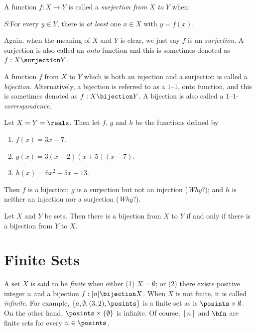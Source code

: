 A function $f:X\rightarrow Y$ is called a \textit{surjection from}
$X$ \textit{to} $Y$ when:

\medskip
\noindent
$S$:\quad For every $y\in Y$, there is \textit{at least} one $x\in X$ with
$y=f(x)$.

\medskip
Again, when the meaning of $X$ and $Y$ is clear, we just say $f$ is an 
\textit{surjection}.  A surjection is also called an \textit{onto} 
function and this is sometimes denoted as\\
$f:X\surjection Y$.

A function $f$ from $X$ to $Y$ which is both an injection and a surjection
is called a \textit{bijection}.  Alternatively, a bijection is referred
to as a $1$--$1$, onto function, and this is sometimes denoted as
$f:X \bijection Y$.  A bijection is also called a 
$1$--$1$-\textit{correspondence}.

\begin{example}
Let $X=Y=\reals$.  Then let $f$, $g$ and $h$ be the
functions defined by

\begin{enumerate}
\item $f(x)=3x-7$.
\item $g(x)=3(x-2)(x+5)(x-7)$.
\item $h(x)=6x^2-5x+13$.
\end{enumerate}
Then $f$ is a bijection; $g$ is a surjection but not an
injection (\textit{Why}?); and $h$ is neither an injection nor a
surjection (\textit{Why}?).
\end{example}

\begin{proposition}
Let $X$ and $Y$ be sets. Then there is a bijection from $X$ to $Y$
if and only if there is a bijection from $Y$ to $X$.
\end{proposition}

\section{Finite Sets}

A set $X$ is said to be \textit{finite} when either (1) $X=\emptyset$; or
(2) there exists positive integer $n$ and a bijection $f:[n]\bijection X$.
When $X$ is not finite, it is called \textit{infinite}.  For example,
$\{a,\emptyset,(3,2),\posints\}$ is a finite set as is
$\posints\times\emptyset$.  On the other hand, $\posints\times
\{\emptyset\}$ is infinite.  Of course, $[n]$ and $\bfn$ are
finite sets for every $n\in\posints$.


